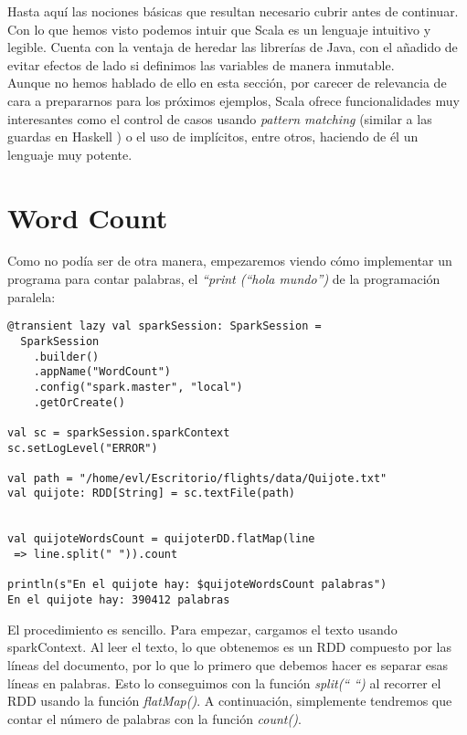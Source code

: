 Hasta aquí las nociones básicas que resultan necesario cubrir antes de continuar. Con lo que hemos visto podemos intuir que Scala es un lenguaje intuitivo y legible. Cuenta con la ventaja de heredar las librerías de Java, con el añadido de evitar efectos de lado si definimos las variables de manera inmutable.\\

Aunque no hemos hablado de ello en esta sección, por carecer de relevancia de cara a prepararnos para los próximos ejemplos, Scala ofrece funcionalidades muy interesantes como el control de casos usando \textit{pattern matching} (similar a las guardas en Haskell ) o el uso de implícitos, entre otros, haciendo de él un lenguaje muy potente. 

\section{Word Count}

Como no podía ser de otra manera, empezaremos viendo cómo implementar un programa para contar palabras, el \textit{“print (“hola mundo”)} de la programación paralela:\\

\begin{lstlisting}[frame=single]
@transient lazy val sparkSession: SparkSession =
  SparkSession
    .builder()
    .appName("WordCount")
    .config("spark.master", "local")
    .getOrCreate()
      
val sc = sparkSession.sparkContext
sc.setLogLevel("ERROR")

val path = "/home/evl/Escritorio/flights/data/Quijote.txt"
val quijote: RDD[String] = sc.textFile(path)


val quijoteWordsCount = quijoterDD.flatMap(line 
 => line.split(" ")).count
 
println(s"En el quijote hay: $quijoteWordsCount palabras")
En el quijote hay: 390412 palabras

\end{lstlisting}

El procedimiento es sencillo. Para empezar, cargamos el texto usando sparkContext. Al leer el texto, lo que obtenemos es un RDD compuesto por las líneas del documento, por lo que lo primero que debemos hacer es separar esas líneas en palabras. Esto lo conseguimos con la función \textit{split(“ “)} al recorrer el RDD usando la función \textit{flatMap()}. A continuación, simplemente tendremos que contar el número de palabras con la función \textit{count()}.\\

